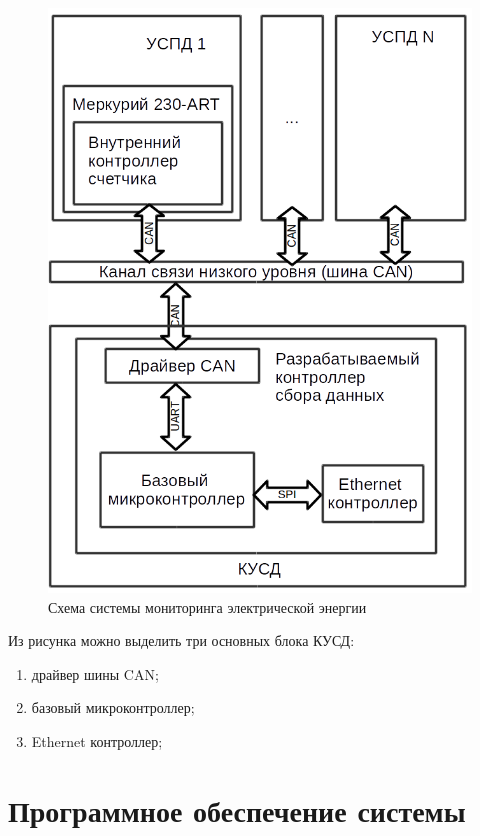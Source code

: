 \begin{figure}[h!]
	\centering
		\includegraphics[scale=0.5]{img/controller_mercury.png}
	\caption{Схема системы мониторинга электрической энергии \label{fig:controllerandmercury}}
\end{figure}

Из рисунка можно выделить три основных блока КУСД:
\begin{enumerate}
	\item драйвер шины CAN;
	\item базовый микроконтроллер;
	\item Ethernet контроллер;
\end{enumerate}

\section{Программное обеспечение системы}

